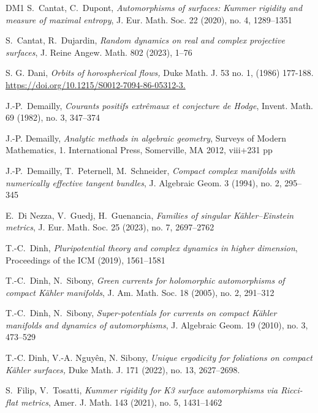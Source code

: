 \documentclass[11pt]{article}
\newcommand{\6}{\partial}
\begin{document}
{\begin{thebibliography}{DM1}
S.\ Cantat, C.\ Dupont,
{\em Automorphisms of surfaces: Kummer rigidity and measure of maximal entropy},
J. Eur. Math. Soc. 22 (2020), no. 4, 1289--1351

S.\ Cantat, R.\ Dujardin,
{\em Random dynamics on real and complex projective surfaces},
J. Reine Angew. Math. 802 (2023), 1--76

S. G. Dani, {\em Orbits of horospherical flows,}
Duke Math. J. 53 no. 1, (1986) 177-188. 
\url{https://doi.org/10.1215/S0012-7094-86-05312-3.}

J.-P.\ Demailly, {\it Courants positifs extr\^{e}maux et conjecture de {H}odge},
Invent. Math. 69 (1982), no. 3, 347--374

J.-P. Demailly, {\it Analytic methods in algebraic geometry},
Surveys of Modern Mathematics, 1. International Press, Somerville, MA 2012, viii+231 pp

J.-P.\ Demailly, T.\ Peternell, M.\ Schneider, {\it Compact complex manifolds with numerically effective tangent bundles},
J. Algebraic Geom. 3 (1994), no. 2, 295--345

E.\ Di Nezza, V.\ Guedj, H.\ Guenancia, {\it Families of singular K\"ahler--Einstein metrics},
J. Eur. Math. Soc. 25 (2023), no. 7, 2697--2762

T.-C.\ Dinh, {\it Pluripotential theory and complex dynamics in higher dimension},
Proceedings of the ICM (2019), 1561--1581 

T.-C.\ Dinh, N.\ Sibony, {\it Green currents for holomorphic automorphisms of compact K\"ahler manifolds},
J. Am. Math. Soc. 18 (2005), no. 2, 291--312


T.-C.\ Dinh, N.\ Sibony, {\it Super-potentials for currents on compact K\"ahler manifolds and dynamics of automorphisms},
J. Algebraic Geom. 19 (2010), no. 3, 473--529

T.-C. Dinh, V.-A. Nguy\^en, N. Sibony, 
{\em Unique ergodicity for foliations on compact K\"ahler surfaces,} 
Duke Math. J. 171 (2022), no. 13, 2627--2698. 

S.\ Filip, V.\ Tosatti,
{\em Kummer rigidity for K3 surface automorphisms via Ricci-flat metrics},
Amer. J. Math. 143 (2021), no. 5, 1431--1462 


\end{thebibliography}}
\end{document}
